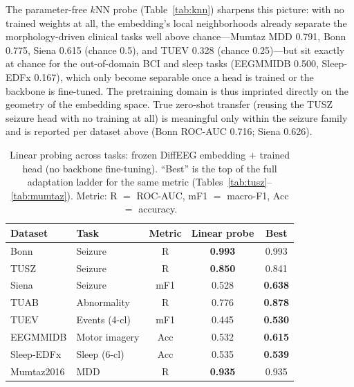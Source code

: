 \documentclass[journal]{IEEEtran}
\newcommand{\best}[1]{\textbf{#1}}
\begin{document}
The parameter-free $k$NN probe (Table~\ref{tab:knn}) sharpens this picture: with
no trained weights at all, the embedding's local neighborhoods already separate
the morphology-driven clinical tasks well above chance---Mumtaz MDD
\num{0.791}, Bonn \num{0.775}, Siena \num{0.615} (chance \num{0.5}), and TUEV
\num{0.328} (chance \num{0.25})---but sit exactly at chance for the out-of-domain
BCI and sleep tasks (EEGMMIDB \num{0.500}, Sleep-EDFx \num{0.167}), which only
become separable once a head is trained or the backbone is fine-tuned. The
pretraining domain is thus imprinted directly on the geometry of the embedding
space. True zero-shot transfer (reusing the TUSZ seizure head with no training at
all) is meaningful only within the seizure family and is reported per dataset
above (Bonn ROC-AUC \num{0.716}; Siena \num{0.626}).

\begin{table}[t]
\centering
\caption{Linear probing across tasks: frozen DiffEEG embedding $+$ trained head
(no backbone fine-tuning). ``Best'' is the top of the full adaptation ladder for
the same metric (Tables~\ref{tab:tusz}--\ref{tab:mumtaz}). Metric: R $=$ ROC-AUC,
mF1 $=$ macro-F1, Acc $=$ accuracy.}
\label{tab:linprobe}
\small
\begin{tabular}{@{}llccc@{}}
\toprule
Dataset & Task & Metric & Linear probe & Best \\
\midrule
Bonn        & Seizure       & R   & \best{0.993} & 0.993 \\
TUSZ        & Seizure       & R   & \best{0.850} & 0.841 \\
Siena       & Seizure       & mF1 & 0.528 & \best{0.638} \\
TUAB        & Abnormality   & R   & 0.776 & \best{0.878} \\
TUEV        & Events (4-cl) & mF1 & 0.445 & \best{0.530} \\
EEGMMIDB    & Motor imagery & Acc & 0.532 & \best{0.615} \\
Sleep-EDFx  & Sleep (6-cl)  & Acc & 0.535 & \best{0.539} \\
Mumtaz2016  & MDD           & R   & \best{0.935} & 0.935 \\
\bottomrule
\end{tabular}
\end{table}
\end{document}
